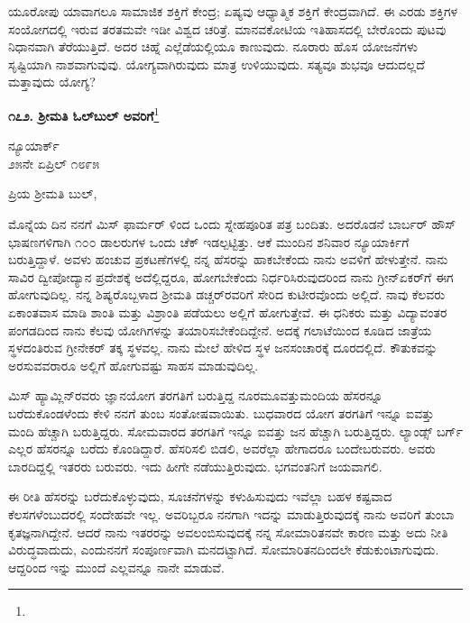 ಯೂರೋಪು ಯಾವಾಗಲೂ ಸಾಮಾಜಿಕ ಶಕ್ತಿಗೆ ಕೇಂದ್ರ; ಏಷ್ಯವು ಆಧ್ಯಾತ್ಮಿಕ ಶಕ್ತಿಗೆ ಕೇಂದ್ರವಾಗಿದೆ. ಈ ಎರಡು ಶಕ್ತಿಗಳ ಸಂಯೋಗದಲ್ಲಿ ಇರುವ ತರತಮವೇ ಇಡೀ ವಿಶ್ವದ ಚರಿತ್ರೆ. ಮಾನವಕೋಟಿಯ ಇತಿಹಾಸದಲ್ಲಿ ಬೇರೊಂದು ಪುಟವು ನಿಧಾನವಾಗಿ ತೆರೆಯುತ್ತಿದೆ. ಅದರ ಚಿಹ್ನೆ ಎಲ್ಲೆಡೆಯಲ್ಲಿಯೂ ಕಾಣುವುದು. ನೂರಾರು ಹೊಸ ಯೋಜನೆಗಳು ಸೃಷ್ಟಿಯಾಗಿ ನಾಶವಾಗುವುವು. ಯೋಗ್ಯವಾಗಿರುವುದು ಮಾತ್ರ ಉಳಿಯುವುದು. ಸತ್ಯವೂ ಶುಭವೂ ಆದುದಲ್ಲದೆ ಮತ್ತಾವುದು ಯೋಗ್ಯ?

\begin{center}
\textbf{೧೭೨. ಶ‍್ರೀಮತಿ ಓಲ್‌ಬುಲ್‌ ಅವರಿಗೆ}\footnote{}
\end{center}

\begin{flushright}
ನ್ಯೂಯಾರ್ಕ್\\೨೫ನೇ ಏಪ್ರಿಲ್ ೧೮೯೫
\end{flushright}

\noindent
ಪ್ರಿಯ ಶ‍್ರೀಮತಿ ಬುಲ್,

ಮೊನ್ನೆಯ ದಿನ ನನಗೆ ಮಿಸ್ ಫಾರ್ಮ‌ರ್ ಳಿಂದ ಒಂದು ಸ್ನೇಹಪೂರಿತ ಪತ್ರ ಬಂದಿತು. ಅದರೊಡನೆ ಬಾರ್ಬರ್ ಹೌಸ್ ಭಾಷಣಗಳಿಗಾಗಿ ೧೦೦ ಡಾಲರುಗಳ ಒಂದು ಚೆಕ್ ಇಡಲ್ಪಟ್ಟಿತ್ತು. ಆಕೆ ಮುಂದಿನ ಶನಿವಾರ ನ್ಯೂಯಾರ್ಕಿಗೆ ಬರುತ್ತಿದ್ದಾಳೆ. ಅವಳು ಹಂಚುವ ಪ್ರಕಟಣೆಗಳಲ್ಲಿ ನನ್ನ ಹೆಸರನ್ನು ಹಾಕಬೇಕೆಂದು ನಾನು ಅವಳಿಗೆ ಹೇಳುತ್ತೇನೆ. ನಾನು ಸಾವಿರ ದ್ವೀಪೋದ್ಯಾನ ಪ್ರದೇಶಕ್ಕೆ  ಅದೆಲ್ಲಿದ್ದರೂ, ಹೋಗಬೇಕೆಂದು ನಿರ್ಧರಿಸಿರುವುದರಿಂದ ನಾನು ಗ್ರೀನ್‌ಏಕರ್‌ಗೆ ಈಗ ಹೋಗುವುದಿಲ್ಲ. ನನ್ನ ಶಿಷ್ಯರೊಬ್ಬಳಾದ ಶ‍್ರೀಮತಿ ಡಚ್ಚರ್‌ರವರಿಗೆ ಸೇರಿದ ಕುಟೀರವೊಂದು ಅಲ್ಲಿದೆ. ನಾವು ಕೆಲವರು ಏಕಾಂತವಾಸ ಮಾಡಿ ಶಾಂತಿ ಮತ್ತು ವಿಶ್ರಾಂತಿ ಪಡೆಯಲು ಅಲ್ಲಿಗೆ ಹೋಗುತ್ತೇವೆ. ಈ ಧನಿಕರು ಮತ್ತು ವಿದ್ಯಾವಂತರ ಪಂಗಡದಿಂದ ನಾನು ಕೆಲವು ಯೋಗಿಗಳನ್ನು ತಯಾರಿಸಬೇಕೆಂದಿದ್ದೇನೆ. ಅದಕ್ಕೆ ಗಲಾಟೆಯಿಂದ ಕೂಡಿದ ಜಾತ್ರೆಯ ಸ್ಥಳದಂತಿರುವ ಗ್ರೀನೇಕರ್ ತಕ್ಕ ಸ್ಥಳವಲ್ಲ. ನಾನು ಮೇಲೆ ಹೇಳಿದ ಸ್ಥಳ ಜನಸಂಚಾರಕ್ಕೆ ದೂರದಲ್ಲಿದೆ. ಕೌತುಕವನ್ನು ಅರಸುವವರಾರೂ ಅಲ್ಲಿಗೆ ಹೋಗುವಷ್ಟು ಸಾಹಸ ಮಾಡುವುದಿಲ್ಲ.

ಮಿಸ್ ಹ್ಯಾಮ್ಲಿನ್‌ರವರು ಜ್ಞಾನಯೋಗ ತರಗತಿಗೆ ಬರುತ್ತಿದ್ದ ನೂರಮೂವತ್ತು\break ಮಂದಿಯ ಹೆಸರನ್ನೂ ಬರೆದುಕೊಂಡಳೆಂದು ಕೇಳಿ ನನಗೆ ತುಂಬ ಸಂತೋಷವಾಯಿತು. ಬುಧವಾರದ ಯೋಗ ತರಗತಿಗೆ ಇನ್ನೂ ಐವತ್ತು ಮಂದಿ ಹೆಚ್ಚಾಗಿ ಬರುತ್ತಿದ್ದರು. ಸೋಮವಾರದ ತರಗತಿಗೆ ಇನ್ನೂ ಐವತ್ತು ಜನ ಹೆಚ್ಚಾಗಿ ಬರುತ್ತಿದ್ದರು. ಲ್ಯಾಂಡ್ಸ್ ಬರ್ಗ್ ಎಲ್ಲರ ಹೆಸರನ್ನೂ ಬರೆದು ಕೊಂಡಿದ್ದಾರೆ. ಹೆಸರಿಸಲಿ ಬಿಡಲಿ, ಅವರೆಲ್ಲಾ ಹೇಗಾದರೂ ಬಂದೇಬರುವರು. ಅವರು ಬಾರದಿದ್ದಲ್ಲಿ ಇತರರು ಬರುವರು. ಇದು ಹೀಗೇ ನಡೆಯುತ್ತಿರುವುದು. ಭಗವಂತನಿಗೆ ಜಯವಾಗಲಿ.

ಈ ರೀತಿ ಹೆಸರನ್ನು ಬರೆದುಕೊಳ್ಳುವುದು, ಸೂಚನೆಗಳನ್ನು ಕಳುಹಿಸುವುದು ಇವೆಲ್ಲಾ ಬಹಳ ಕಷ್ಟವಾದ ಕೆಲಸಗಳೆಂಬುದರಲ್ಲಿ ಸಂದೇಹವೇ ಇಲ್ಲ. ಅವರಿಬ್ಬರೂ ನನಗಾಗಿ ಇದನ್ನು ಮಾಡುತ್ತಿರುವುದಕ್ಕೆ ನಾನು ಅವರಿಗೆ ತುಂಬಾ ಕೃತಜ್ಞನಾಗಿದ್ದೇನೆ. ಆದರೆ ನಾನು ಇತರರನ್ನು ಅವಲಂಬಿಸುವುದಕ್ಕೆ ನನ್ನ ಸೋಮಾರಿತನವೇ ಕಾರಣ ಮತ್ತು ಅದು ನೀತಿ ವಿರುದ್ಧವಾದುದು, ಎಂದುನನಗೆ ಸಂಪೂರ್ಣವಾಗಿ ಮನದಟ್ಟಾಗಿದೆ. ಸೋಮಾರಿತನದಿಂದಲೇ ಕೆಡುಕುಂಟಾಗುವುದು. ಆದ್ದರಿಂದ ಇನ್ನು ಮುಂದೆ ಎಲ್ಲವನ್ನೂ ನಾನೇ ಮಾಡುವೆ.

